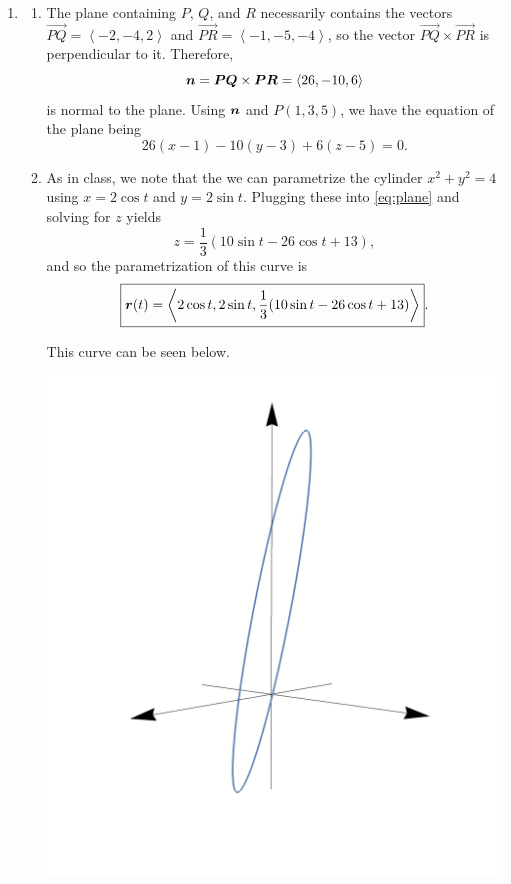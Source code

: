 \documentclass[12pt]{article}
\newcommand{\compslong}[3]{\left\langle #1, #2, #3\right\rangle}
\begin{document}
{\begin{enumerate}
		\newpage
		
		\item \begin{enumerate}
			\item The plane containing $P$, $Q$, and $R$ necessarily contains the vectors $\vec{PQ}=\compslong{-2}{-4}{2}$ and $\vec{PR}=\compslong{-1}{-5}{-4}$, so the vector $\vec{PQ}\times\vec{PR}$ is perpendicular to it. Therefore,
			$$\vect{n}=\vec{PQ}\times\vec{PR}=\compslong{26}{-10}{6}$$
			is normal to the plane. Using $\boldsymbol{n}$ and $P(1,3,5)$, we have the equation of the plane being
			\begin{equation}
				\label{eq:plane}
				\boxed{26(x-1)-10(y-3)+6(z-5)=0}.
			\end{equation}
			\item As in class, we note that the we can parametrize the cylinder $x^2+y^2=4$ using $x=2\cos{t}$ and $y=2\sin{t}$. Plugging these into \eqref{eq:plane} and solving for $z$ yields
			$$z=\frac{1}{3} (10 \sin{t}-26 \cos{t}+13),$$
			and so the parametrization of this curve is
			$$\boxed{\vect{r}(t)=\compslong{2\cos{t}}{2\sin{t}}{\frac{1}{3} (10\sin{t}-26\cos{t}+13)}}.$$
			
			This curve can be seen below.
			
			\begin{center}\includegraphics[scale=0.7]{ExamReviewAnswerCurve}\end{center}
			\end{enumerate}
		

\end{enumerate}}
\end{document}
